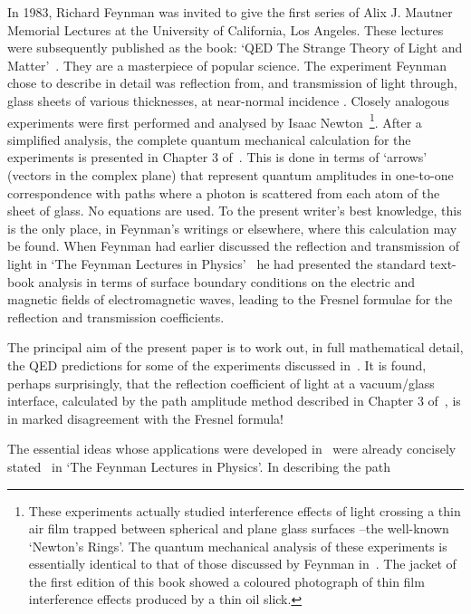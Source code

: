 \documentclass [12pt]{article}
\newcommand{\BS}{\bigskip}
\newcommand{\SECTION}[1]{\BS{\large\section{\bf #1}}}
\begin{document}
\SECTION{\bf{Introduction}}
  In 1983, Richard Feynman was invited to give the first series of Alix J. Mautner Memorial
 Lectures at the University of California, Los Angeles. These lectures were subsequently
 published as the book: `QED The Strange Theory of Light and Matter'~\cite{Feyn1}. They are
 a masterpiece of popular science. The experiment Feynman chose to describe in detail was
  reflection from, and transmission of light through, glass sheets of various
 thicknesses, at near-normal incidence . Closely analogous experiments were first performed and analysed by
 Isaac Newton~\cite{Newton}\footnote{ These experiments actually studied interference
 effects of light crossing a thin air film trapped between spherical and plane 
 glass surfaces --the well-known `Newton's Rings'. The quantum mechanical analysis
 of these experiments is essentially identical to that of those discussed by Feynman in~\cite{Feyn1}.
 The jacket of the first edition of this book showed a coloured photograph of 
 thin film interference effects produced by a thin oil slick.}. After a simplified analysis,
 the complete quantum mechanical calculation for the experiments is presented in Chapter 3 
 of~\cite{Feyn1}. This is done in terms of `arrows' (vectors in the complex plane)
  that represent quantum amplitudes in one-to-one
 correspondence with paths where a photon is scattered from each atom of the sheet of glass.
 No equations are used. To the present writer's best knowledge, this is the only place, in
 Feynman's writings or elsewhere, where this calculation may be found. When Feynman had
 earlier discussed the reflection and transmission of light in `The Feynman Lectures in 
  Physics'~\cite{Feyn2} he had presented the standard text-book analysis in terms of surface
  boundary conditions on the electric and magnetic fields of electromagnetic waves, 
 leading to the Fresnel formulae 
 for the reflection and transmission coefficients. 
 \par The principal aim of the present paper is to work out, in full mathematical detail,
  the QED predictions for some of the experiments discussed in~\cite{Feyn1}. It is found, perhaps 
   surprisingly, that the reflection coefficient of light at a vacuum/glass interface, calculated
   by the path amplitude method described in Chapter 3 of~\cite{Feyn1}, is in marked disagreement
  with the Fresnel formula! 
  \par The essential ideas whose applications were developed in~\cite{Feyn1} were already
  concisely stated~\cite{Feyn3} in `The Feynman Lectures in Physics'. In describing the path
\end{document}
